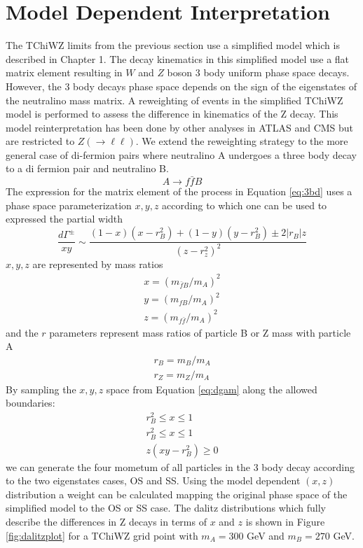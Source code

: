 \section{Model Dependent Interpretation}
The TChiWZ limits from the previous section use a simplified model which is described in Chapter 1. The decay kinematics in this simplified model  use a flat matrix element resulting in $W$ and $Z$ boson 3 body uniform phase space decays. However, the 3 body decays phase space depends on the sign of the eigenstates of the neutralino mass matrix. A reweighting of events in the simplified TChiWZ model is performed to assess the difference in kinematics of the Z decay. This model reinterpretation has been done by other analyses in ATLAS and CMS \cite{cms1}\cite{alts} but are restricted to $Z(\rightarrow \ell\ell)$. We extend the reweighting strategy to the more general case of di-fermion pairs where neutralino A undergoes a three body decay to a di fermion pair and neutralino B. 
\begin{equation}
\label{eq:3bd}
A \rightarrow f \bar{f} B
\end{equation}
The expression for the matrix element of the process in Equation \ref{eq:3bd} uses a phase space parameterization $x,y,z$ according to \cite{Nojiri:1999ki} which one can be used to expressed the partial width 
\begin{equation}
\label{eq:dgam}
\frac{d\Gamma^\pm}{xy}\sim \frac{(1-x)(x-r_B^2)+(1-y)(y-r_B^2)\pm 2|r_B|z}{(z-r_z^2)^2}
\end{equation}
$x,y,z$ are represented by mass ratios
\begin{equation}
\begin{split}
x=(m_{\bar{f}B}/m_A)^2 \\
y=(m_{fB}/m_A)^2 \\
z=(m_{f\bar{f}}/m_A)^2 
\end{split}
\end{equation} 
and the $r$ parameters represent mass ratios of particle B or Z mass with particle A
\begin{equation}
\begin{split}
r_B = m_B/m_A \\
r_Z = m_Z/m_A 
\end{split}
\end{equation}
By sampling the $x,y,z$ space from Equation \ref{eq:dgam} along the allowed boundaries:
\begin{equation}
\begin{split}
r_B^2 \leq x \leq 1 \\
r_B^2 \leq x \leq 1 \\
z(xy-r_B^2) \geq 0
\end{split}
\end{equation}
we can generate the four mometum of all particles in the 3 body decay according to the two eigenstates cases, OS and SS. Using the model dependent $(x,z)$ distribution a weight can be calculated mapping the original phase space of the simplified model to the OS or SS case. The  dalitz distributions which fully describe the differences in Z decays in terms of $x$ and $z$ is shown in Figure \ref{fig:dalitzplot} for a TChiWZ grid point with $m_A = 300$ GeV and $m_B= 270$ GeV.

